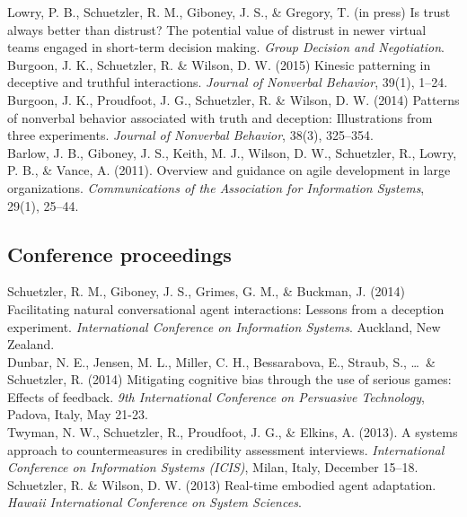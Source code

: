 \documentclass[10pt, a4paper]{article}
\newcommand{\years}[1]{\marginnote{\scriptsize #1}}
\begin{document}
\years{In press}Lowry, P. B., Schuetzler, R. M., Giboney, J. S., \& Gregory, T. (in
press) Is trust always better than distrust? The potential value of distrust in
newer virtual teams engaged in short-term decision making. \emph{Group Decision and
  Negotiation}.\\

\years{2015}Burgoon, J. K., Schuetzler, R. \& Wilson, D. W. (2015) Kinesic patterning in
deceptive and truthful interactions.  \emph{Journal of Nonverbal Behavior}, 39(1), 1--24.\\

\years{2014}Burgoon, J. K., Proudfoot, J. G., Schuetzler, R. \& Wilson,
D. W. (2014) Patterns of nonverbal behavior associated with truth and
deception: Illustrations from three experiments. \emph{Journal of Nonverbal
  Behavior}, 38(3), 325--354.\\

\years{2011}Barlow, J. B., Giboney, J. S., Keith, M. J., Wilson, D. W.,
Schuetzler, R., Lowry, P. B., \& Vance, A. (2011). Overview and guidance on
agile development in large organizations. \emph{Communications of the
  Association for Information Systems}, 29(1), 25--44.

\subsection*{Conference proceedings}
\noindent
\years{2014}Schuetzler, R. M., Giboney, J. S., Grimes, G. M., \& Buckman,
J. (2014) Facilitating natural conversational agent interactions: Lessons from a
deception experiment. \emph{International Conference on Information Systems}. Auckland, New Zealand.\\

Dunbar, N. E., Jensen, M. L., Miller, C. H., Bessarabova, E.,
Straub, S., \ldots~\& Schuetzler, R. (2014) Mitigating cognitive bias through
the use of serious games: Effects of feedback. \emph{9th International
  Conference on
  Persuasive Technology}, Padova, Italy, May 21-23.\\

\years{2013}Twyman, N. W., Schuetzler, R., Proudfoot, J. G., \& Elkins,
A. (2013). A systems approach to countermeasures in credibility assessment
interviews. \emph{International Conference on Information Systems (ICIS)},
Milan, Italy, December 15--18.\\

Schuetzler, R. \& Wilson, D. W. (2013) Real-time embodied agent
adaptation. \emph{Hawaii International Conference on System Sciences}.\\
\end{document}

